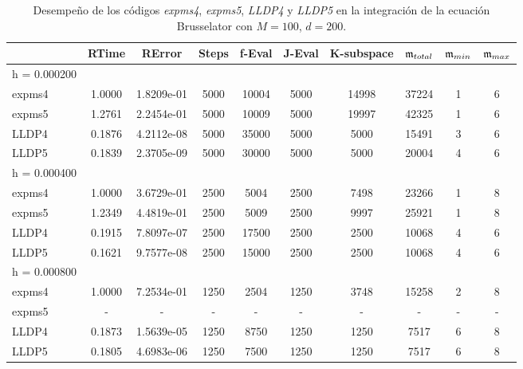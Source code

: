 \begin{table}[h]
	\caption{Desempeño de los códigos \emph{expms4}, \emph{expms5}, \emph{LLDP4} y \emph{LLDP5} en la integración de la ecuación Brusselator con $M=100$, $d=200$.}
	\centering
	\begin{tabular}{lccccccccc}
		\hline
		& RTime & RError & Steps & f-Eval & J-Eval & K-subspace & $\mathfrak{m}_{total}$ & $\mathfrak{m}_{min}$ & $\mathfrak{m}_{max}$ \\
		\hline
		h = 0.000200 &  &  &  &  &  &  &  &  &  \\
		expms4 & 1.0000 & 1.8209e-01 & 5000 & 10004 & 5000 & 14998 & 37224 & 1 & 6  \\
		expms5 & 1.2761 & 2.2454e-01 & 5000 & 10009 & 5000 & 19997 & 42325 & 1 & 6  \\
		LLDP4 & 0.1876 & 4.2112e-08 & 5000 & 35000 & 5000 & 5000 & 15491 & 3 & 6  \\
		LLDP5 & 0.1839 & 2.3705e-09 & 5000 & 30000 & 5000 & 5000 & 20004 & 4 & 6  \\
		\hline
		h = 0.000400 &  &  &  &  &  &  &  &  &  \\
		expms4 & 1.0000 & 3.6729e-01 & 2500 & 5004 & 2500 & 7498 & 23266 & 1 & 8  \\
		expms5 & 1.2349 & 4.4819e-01 & 2500 & 5009 & 2500 & 9997 & 25921 & 1 & 8  \\
		LLDP4 & 0.1915 & 7.8097e-07 & 2500 & 17500 & 2500 & 2500 & 10068 & 4 & 6  \\
		LLDP5 & 0.1621 & 9.7577e-08 & 2500 & 15000 & 2500 & 2500 & 10068 & 4 & 6  \\
		\hline
		h = 0.000800 &  &  &  &  &  &  &  &  &  \\
		expms4 & 1.0000 & 7.2534e-01 & 1250 & 2504 & 1250 & 3748 & 15258 & 2 & 8  \\
		expms5 & - & - & - & - & - & - &- & - & -\\
		LLDP4 & 0.1873 & 1.5639e-05 & 1250 & 8750 & 1250 & 1250 & 7517 & 6 & 8  \\
		LLDP5 & 0.1805 & 4.6983e-06 & 1250 & 7500 & 1250 & 1250 & 7517 & 6 & 8  \\
		\hline
	\end{tabular}
	\label{tab:num-exp-lldp-fix-step:brna}
\end{table}

